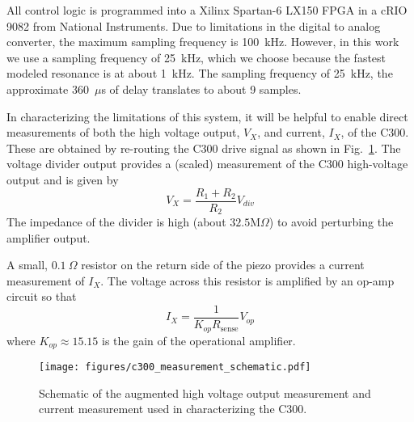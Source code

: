 \documentclass[journal,twocolumn,twoside]{IEEEtran}
\begin{document}
All control logic is programmed into a Xilinx Spartan-6 LX150 FPGA in a cRIO 9082 from National Instruments. Due to limitations in the digital to analog converter, the maximum sampling frequency is 100~kHz. However, in this work we use a sampling frequency of 25~kHz, which we choose because the fastest modeled resonance is at about 1~kHz. The sampling frequency of 25~kHz, the approximate 360~$\mu$s of delay translates to about 9 samples.

In characterizing the limitations of this system, it will be helpful to enable direct measurements of both the high voltage output, $V_X$, and current, $I_X$, of the C300. These are obtained by re-routing the C300 drive signal as shown in Fig.~\ref{fig:c300_meas}. The voltage divider output provides a (scaled) measurement of the C300 high-voltage output and is given by
\begin{equation}
V_X = \frac{R_1 + R_2}{R_2}V_{div}
\end{equation}
The impedance of the divider is high (about $32.5\text{M}\Omega$) to avoid perturbing the amplifier output.

A small, $0.1~\Omega$ resistor on the return side of the piezo provides a current measurement of $I_X$. The voltage across this resistor is amplified by an op-amp circuit so that
\begin{equation}
I_{X} = \frac{1}{K_{op}R_{\text{sense}}}V_{op}
\end{equation}
where $K_{op}\approx 15.15$ is the gain of the operational amplifier.
\begin{figure}
    \texttt{[image: figures/c300\_measurement\_schematic.pdf]}
    \caption{Schematic of the augmented high voltage output measurement and current measurement used in characterizing the C300.}
    \label{fig:c300_meas}
\end{figure}
\end{document}

